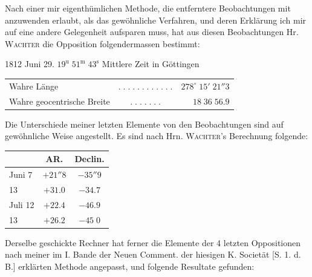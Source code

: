 \par\indent Nach einer mir eigenthümlichen Methode, die entferntere Beobachtungen mit
anzuwenden erlaubt, als das gewöhnliche Verfahren, und deren Erklärung
ich mir auf eine andere Gelegenheit aufsparen muss, hat aus diesen
Beobachtungen Hr. \textsc{Wachter} die Opposition folgendermassen bestimmt:

1812 Juni 29. $19^{\mathrm u}\;51^{\mathrm m}\;43^{\mathrm s}$ Mittlere Zeit in Göttingen

\begin{center}\fontsize{10}{12}\selectfont\setlength{\tabcolsep}{2pt}\renewcommand{\arraystretch}{1.15}\begin{tabular}{lcr}
Wahre Länge & $.\;.\;.\;.\;.\;.\;.\;.\;.\;.\;.\;.$ & $278^\circ\;15'\;21''3$\\
Wahre geocentrische Breite & $.\;.\;.\;.\;.\;.\;.$ & $18\;36\;56.9$\\
\end{tabular}\end{center}

\par\indent Die Unterschiede meiner letzten Elemente von den Beobachtungen sind auf
gewöhnliche Weise angestellt. Es sind nach Hrn. \textsc{Wachter}'s Berechnung
folgende:

\begin{center}\fontsize{10}{12}\selectfont\setlength{\tabcolsep}{7pt}\renewcommand{\arraystretch}{1.15}\begin{tabular}{l|c|c}
& AR. & Declin.\\\hline
Juni 7 & $+21''8$ & $-35''9$\\
13 & $+31.0$ & $-34.7$\\
Juli 12 & $+22.4$ & $-46.9$\\
13 & $+26.2$ & $-45\;0$\\
\end{tabular}\end{center}

\par\indent Derselbe geschickte Rechner hat ferner die Elemente der 4 letzten
Oppositionen nach meiner im I. Bande der Neuen Comment. der hiesigen
K. Societät [S. 1. d. B.] erklärten Methode angepasst, und folgende
Resultate gefunden:

